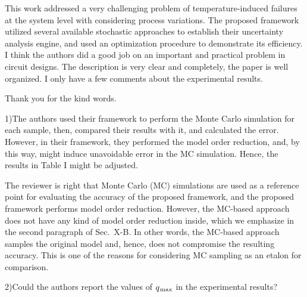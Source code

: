 \begin{reviewer}
This work addressed a very challenging problem of temperature-induced failures
at the system level with considering process variations. The proposed framework
utilized several available stochastic approaches to establish their uncertainty
analysis engine, and used an optimization procedure to demonstrate its
efficiency. I think the authors did a good job on an important and practical
problem in circuit designs. The description is very clear and completely, the
paper is well organized. I only have a few comments about the experimental
results.
\end{reviewer}

\begin{authors}
  Thank you for the kind words.
\end{authors}

\begin{reviewer}
1)The authors used their framework to perform the Monte Carlo
simulation for each sample, then, compared their results with it, and
calculated the error. However, in their framework, they performed the model
order reduction, and, by this way, might induce unavoidable error in the MC
simulation. Hence, the results in Table I might be adjusted.
\end{reviewer}

\begin{authors}
The reviewer is right that Monte Carlo (MC) simulations are used as a reference
point for evaluating the accuracy of the proposed framework, and the proposed
framework performs model order reduction. However, the MC-based approach does
not have any kind of model order reduction inside, which we emphasize in the
second paragraph of Sec.~X-B. In other words, the MC-based approach samples the
original model and, hence, does not compromise the resulting accuracy. This is
one of the reasons for considering MC sampling as an etalon for comparison.

\begin{actions}
\end{actions}
\end{authors}

\begin{reviewer}
2)Could the authors report the values of $q_{\text{\kern0.1emmax}}$ in the
experimental results?
\end{reviewer}

